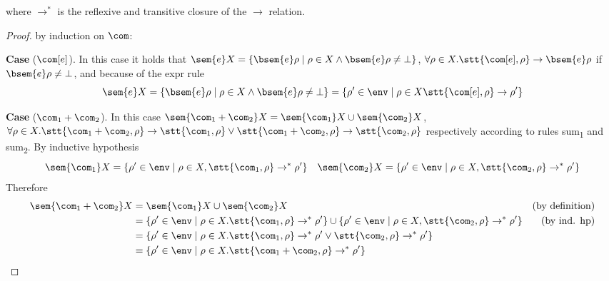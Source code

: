 where \(\to^*\) is the reflexive and transitive closure of the \(\to\)
relation.

\begin{proof}
  by induction on \(\com\):

  \medskip

  \noindent
  \textbf{Case} (\(\com[e]\)). In this case it holds that
  \(\sem{e}X = \{\bsem{e}\rho \mid \rho \in X \wedge \bsem{e}\rho \neq
  \bot \}\),
  \(\forall \rho \in X . \stt{\com[e], \rho} \to \bsem{e}\rho\) if
  \(\bsem{e}\rho \neq \bot\), and because of the expr rule
  \[\sem{e}X = \{\bsem{e}\rho \mid \rho \in X \wedge \bsem{e}\rho \neq
    \bot \} = \{\rho' \in\env \mid \rho \in X \stt{\com[e], \rho} \to
    \rho'\}\]

  \medskip

  \noindent
  \textbf{Case} (\(\com_1 + \com_2\)). In this case
  \(\sem{\com_1 + \com_2}X = \sem{\com_1}X \cup \sem{\com_2}X\),
  \(\forall \rho \in X . \stt{\com_1 + \com_2, \rho} \to
  \stt{\com_1, \rho} \vee \stt{\com_1 + \com_2, \rho} \to
  \stt{\com_2, \rho}\) respectively according to rules
  sum\textsubscript{1} and sum\textsubscript{2}. By inductive
  hypothesis
  \[\sem{\com_1}X = \{\rho' \in\env \mid \rho \in X ,
    \stt{\com_1,\rho} \to^* \rho'\} \quad \sem{\com_2}X = \{\rho'
    \in\env \mid \rho \in X , \stt{\com_2,\rho} \to^* \rho'\}\]
  Therefore
  \begin{align*}
    \sem{\com_1 + \com_2}X & = \sem{\com_1}X \cup \sem{\com_2}X & \text{(by definition)}\\
                           & = \{\rho' \in\env \mid \rho \in X . \stt{\com_1,\rho} \to^* \rho'\} \cup \{\rho' \in\env \mid \rho \in X , \stt{\com_2,\rho} \to^* \rho'\} & \text{(by ind. hp)}\\
                           & = \{\rho' \in\env \mid \rho \in X . \stt{\com_1,\rho} \to^* \rho' \vee \stt{\com_2,\rho} \to^* \rho'\} \\
                           & = \{\rho' \in\env \mid \rho \in X . \stt{\com_1 + \com_2, \rho} \to^* \rho'\}
  \end{align*}

  \medskip


\end{proof}
